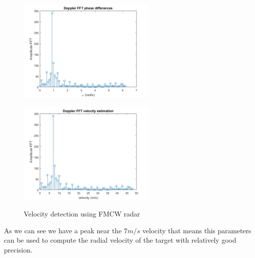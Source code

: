\begin{figure}[h] 
    \begin{minipage}[b]{.49\linewidth}
        \includegraphics[height=5cm,width=\linewidth]{imgs/chapter2/fft3.png}
        \label{fig:fft3}
    \end{minipage}
    \begin{minipage}[b]{.49\linewidth}
        \includegraphics[height=5cm,width=\linewidth]{imgs/chapter2/fft4.png}
        \label{fig:fft4}
    \end{minipage}
    \caption{Velocity detection using \ac{FMCW} \ac{radar}}
    \label{fig:distance determination}
\end{figure}
As we can see we have a peak near the $7 m/s$ velocity that means this parameters can be used to compute the radial velocity of the target with relatively good precision. 

